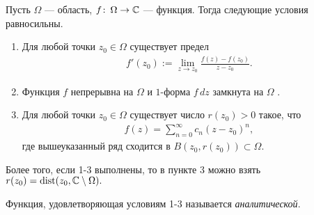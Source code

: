 \documentclass[../complex-analysis.tex]{subfiles}
\begin{document}
\begin{thm}
\label{theorem:cauchy-gursa-morer}
 Пусть $\Omega$  --- область, $f\colon\,\Omega \to \mathbb{C}$  --- функция. Тогда следующие условия равносильны.
 \begin{enumerate}
  \item \label{enum1:theorem:cauchy_gurs_morer} Для любой точки $z_0 \in \Omega$ существует предел
   \begin{align*}
    f'(z_0) := \lim_{z \to z_0} \frac{f(z) - f(z_0)}{z-z_0}.
   \end{align*} 
  \item Функция $f$ непрерывна на $\Omega$ и $1$-форма $f\,dz$  замкнута на $\Omega$ .
  \item Для любой точки $ z_0 \in \Omega$ существует число $r(z_0) > 0$ такое, что
    \begin{align*}
    f(z) = \sum_{n=0}^{\infty} c_n(z-z_0)^{n},
   \end{align*} где вышеуказанный ряд сходится в $B(z_0, r(z_0)) \subset \Omega$.
 \end{enumerate}
 Более того,  если 1-3 выполнены, то в пункте 3 можно взять $r(z_0) = \mathrm{dist}(z_0, \mathbb{C} \setminus \Omega).$
\end{thm}
\begin{df}
 Функция, удовлетворяющая условиям 1-3 называется \textit{аналитической}.
\end{df}
\end{document}
